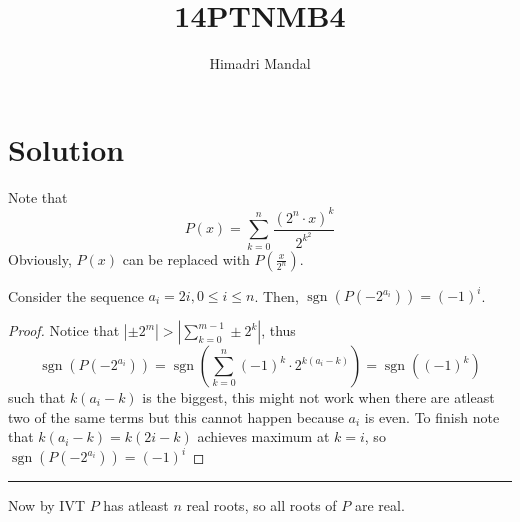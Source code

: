 \documentclass[11pt]{scrartcl}
\title{14PTNMB4}
\author{Himadri Mandal}
\begin{document}
\maketitle

\section{Solution}
\newcommand{\sgn}{\operatorname{sgn}}
\begin{soln}
  Note that 
  \[ P(x) = \sum_{k = 0}^{n} \frac{(2^n \cdot x)^k}{2^{k^2}} \]
  Obviously, $P(x)$ can be replaced with $P(\frac{x}{2^n})$.
\begin{claim*}
  Consider the sequence $a_i = 2i, 0 \leq i \leq n$. Then, $\sgn(P(-2^{a_i})) = (-1)^i$. 
\end{claim*}
\begin{proof}
  Notice that $|\pm 2^m| > |\sum_{k = 0}^{m-1} \pm 2^k|$, thus 
  \[ \sgn(P(-2^{a_i})) = \sgn \left(\sum_{k=0}^{n} (-1)^k \cdot2^{k(a_i - k)} \right) = \sgn((-1)^k)\]
  such that $k(a_i-k)$ is the biggest, this might not work when there are atleast two of the same terms
  but this cannot happen because $a_i$ is even.
  To finish note that $k(a_i - k) = k(2i - k)$ achieves maximum at $k = i$, so 
  $\sgn(P(-2^{a_i})) = (-1)^i$
\end{proof}
\hrule
\bigskip
  Now by IVT $P$ has atleast $n$ real roots, so all roots of $P$ are real.
\end{soln}
\end{document}
